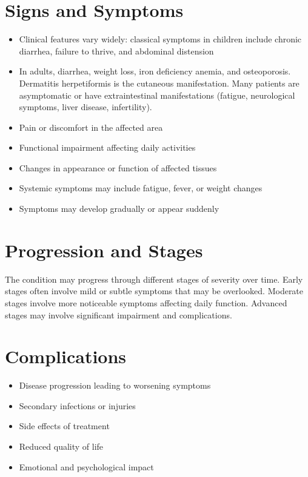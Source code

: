 \section{Signs and Symptoms}
\begin{itemize}[noitemsep]
  \item Clinical features vary widely: classical symptoms in children include chronic diarrhea, failure to thrive, and abdominal distension
  \item In adults, diarrhea, weight loss, iron deficiency anemia, and osteoporosis. Dermatitis herpetiformis is the cutaneous manifestation. Many patients are asymptomatic or have extraintestinal manifestations (fatigue, neurological symptoms, liver disease, infertility).
  \item Pain or discomfort in the affected area
  \item Functional impairment affecting daily activities
  \item Changes in appearance or function of affected tissues
  \item Systemic symptoms may include fatigue, fever, or weight changes
  \item Symptoms may develop gradually or appear suddenly
\end{itemize}
\section{Progression and Stages}
The condition may progress through different stages of severity over time. Early stages often involve mild or subtle symptoms that may be overlooked. Moderate stages involve more noticeable symptoms affecting daily function. Advanced stages may involve significant impairment and complications.
\section{Complications}
\begin{itemize}[noitemsep]
  \item Disease progression leading to worsening symptoms
  \item Secondary infections or injuries
  \item Side effects of treatment
  \item Reduced quality of life
  \item Emotional and psychological impact
\end{itemize}
